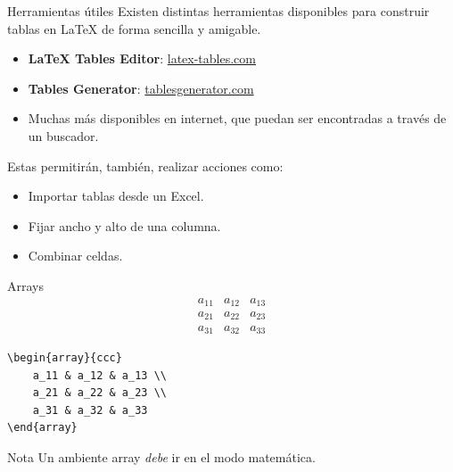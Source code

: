 \documentclass[../slides.tex]{subfiles}
\begin{document}
    \begin{frame}{Herramientas útiles}
        Existen distintas herramientas disponibles para construir tablas en \LaTeX{} de forma sencilla y amigable.

            \begin{itemize}
                \item \textbf{LaTeX Tables Editor}: \href{https://www.latex-tables.com/}{latex-tables.com}
                \item \textbf{Tables Generator}: \href{https://www.tablesgenerator.com/latex_tables}{tablesgenerator.com}
                \item Muchas más disponibles en internet, que puedan ser encontradas a través de un buscador.
            \end{itemize}

        Estas permitirán, también, realizar acciones como:
            \begin{itemize}
                \item Importar tablas desde un Excel.
                \item Fijar ancho y alto de una columna.
                \item Combinar celdas.
            \end{itemize}
    \end{frame}
    
    \begin{frame}[fragile]{Arrays}
    \[
    	\begin{array}{ccc}
            a_11 & a_12 & a_13 \\
            a_21 & a_22 & a_23 \\  
            a_31 & a_32 & a_33
        \end{array}
    \]
\begin{verbatim}
\begin{array}{ccc}
    a_11 & a_12 & a_13 \\
    a_21 & a_22 & a_23 \\  
    a_31 & a_32 & a_33
\end{array}
\end{verbatim}

        \begin{block}{Nota}
        	Un ambiente array \emph{debe} ir en el modo matemática.
        \end{block}
    \end{frame}
\end{document}
